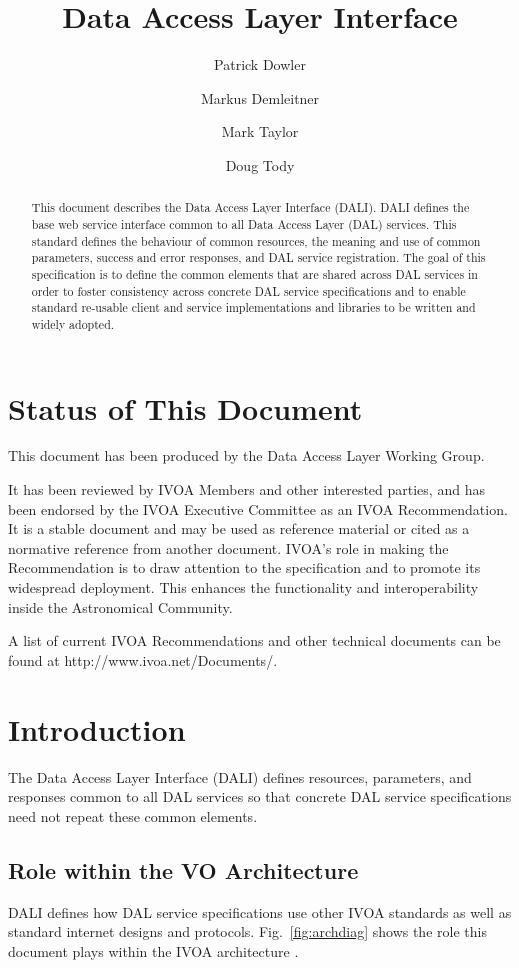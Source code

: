 \documentclass[11pt,letter]{ivoa}
\title{Data Access Layer Interface}
\author{Patrick Dowler}
\author{Markus Demleitner}
\author{Mark Taylor}
\author{Doug Tody}
\begin{document}
\begin{abstract}
This document describes the Data Access Layer Interface (DALI). DALI defines 
the base web service interface common to all Data Access Layer (DAL) services. 
This standard defines the behaviour of common resources, the meaning and use of 
common parameters, success and error responses, and DAL service registration. 
The goal of this specification is to define the common elements that are shared 
across DAL services in order to foster consistency across concrete DAL service 
specifications and to enable standard re-usable client and service 
implementations and libraries to be written and widely adopted.
\end{abstract}


\section*{Status of This Document}
This document has been produced by the Data Access Layer Working Group.

It has been reviewed by IVOA Members and other interested parties, and has been 
endorsed by the IVOA Executive Committee as an IVOA Recommendation. It is a 
stable document and may be used as reference material or cited as a normative 
reference from another document. IVOA's role in making the Recommendation is to 
draw attention to the specification and to promote its widespread deployment. 
This enhances the functionality and interoperability inside the Astronomical 
Community.

A list of current IVOA Recommendations and other technical documents can be 
found at http://www.ivoa.net/Documents/.

\section{Introduction}
The Data Access Layer Interface (DALI) defines resources, parameters, and 
responses common to all DAL services so that concrete DAL service specifications 
need not repeat these common elements.

\subsection{Role within the VO Architecture}
DALI defines how DAL service specifications use other IVOA standards as well as 
standard internet designs and protocols. Fig.~\ref{fig:archdiag} shows the role 
this document plays within the IVOA architecture \citep{note:VOARCH}.
\end{document}

